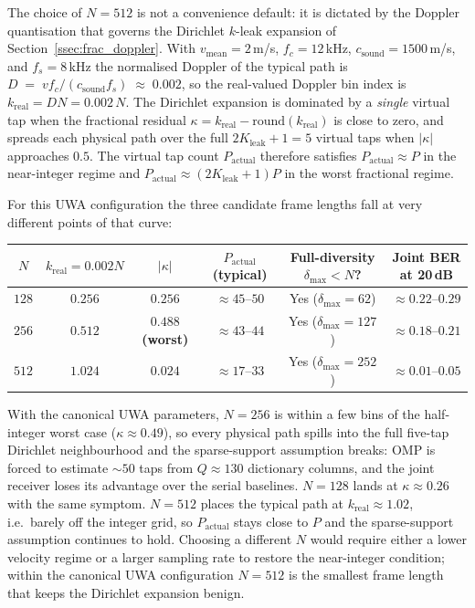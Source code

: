 
The choice of $N = 512$ is not a convenience default: it is dictated by the
Doppler quantisation that governs the Dirichlet $k$-leak expansion of
Section~\ref{ssec:frac_doppler}.  With $v_\mathrm{mean} = 2$\,m/s,
$f_c = 12$\,kHz, $c_\mathrm{sound} = 1500$\,m/s, and $f_s = 8$\,kHz the
normalised Doppler of the typical path is
$D \;=\; v f_c / (c_\mathrm{sound} f_s) \;\approx\; 0.002$,
so the real-valued Doppler bin index is $k_\mathrm{real} = DN = 0.002\,N$.
The Dirichlet expansion is dominated by a \emph{single} virtual tap when the
fractional residual $\kappa = k_\mathrm{real} - \mathrm{round}(k_\mathrm{real})$
is close to zero, and spreads each physical path over the full $2K_\mathrm{leak}+1 = 5$
virtual taps when $|\kappa|$ approaches $0.5$.  The virtual tap count
$P_\mathrm{actual}$ therefore satisfies $P_\mathrm{actual} \approx P$ in the
near-integer regime and $P_\mathrm{actual} \approx (2K_\mathrm{leak}+1)P$ in
the worst fractional regime.

For this UWA configuration the three candidate frame lengths fall at very
different points of that curve:

\begin{center}
\small
\begin{tabular}{cccccc}
\toprule
$N$ & $k_\mathrm{real} = 0.002N$ & $|\kappa|$ & $P_\mathrm{actual}$ (typical) & Full-diversity $\delta_\mathrm{max} < N$? & Joint BER at 20\,dB \\
\midrule
$128$ & $0.256$ & $0.256$ & $\approx 45$--$50$ & Yes ($\delta_\mathrm{max} = 62$) & $\approx 0.22$--$0.29$ \\
$256$ & $0.512$ & $0.488$\textbf{(worst)}    & $\approx 43$--$44$ & Yes ($\delta_\mathrm{max} = 127$) & $\approx 0.18$--$0.21$ \\
$512$ & $1.024$ & $0.024$ & $\approx 17$--$33$ & Yes ($\delta_\mathrm{max} = 252$) & $\approx 0.01$--$0.05$ \\
\bottomrule
\end{tabular}
\end{center}

With the canonical UWA parameters, $N = 256$ is within a few bins of the
half-integer worst case ($\kappa \approx 0.49$), so every physical path
spills into the full five-tap Dirichlet neighbourhood and the sparse-support
assumption breaks: OMP is forced to estimate $\sim 50$ taps from
$Q \approx 130$ dictionary columns, and the joint receiver loses its
advantage over the serial baselines.  $N = 128$ lands at $\kappa \approx 0.26$
with the same symptom.  $N = 512$ places the typical path at
$k_\mathrm{real} \approx 1.02$, i.e.\ barely off the integer grid, so
$P_\mathrm{actual}$ stays close to $P$ and the sparse-support assumption
continues to hold.  Choosing a different $N$ would require either a lower
velocity regime or a larger sampling rate to restore the near-integer
condition; within the canonical UWA configuration $N = 512$ is the smallest
frame length that keeps the Dirichlet expansion benign.
